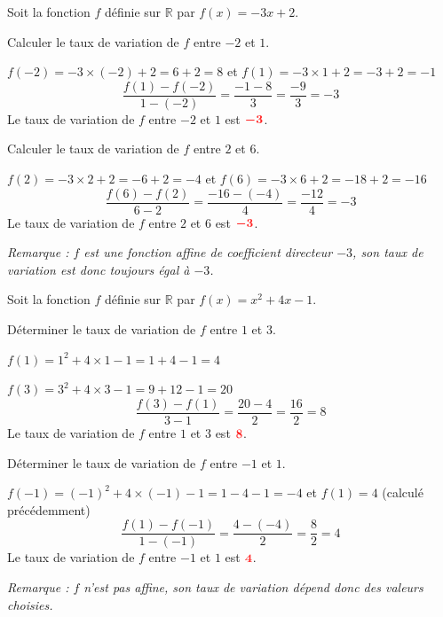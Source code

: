 \documentclass[11pt,a4paper]{article}  %
\begin{document}
\exerciceDS {}
Soit la fonction $f$ définie sur $\mathbb{R}$ par $f(x)=-3x+2$.
\begin{enumMet}
	\item Calculer le taux de variation de $f$ entre $-2$ et $1$.

	\begin{corrBox}
		$f(-2)=-3\times(-2)+2=6+2=8$ \quad et \quad $f(1)=-3\times 1+2=-3+2=-1$
		\[\dfrac{f(1)-f(-2)}{1-(-2)}=\dfrac{-1-8}{3}=\dfrac{-9}{3}=-3\]
		Le taux de variation de $f$ entre $-2$ et $1$ est $\mRouge{-3}$.
	\end{corrBox}

	\item Calculer le taux de variation de $f$ entre $2$ et $6$.

	\begin{corrBox}
		$f(2)=-3\times 2+2=-6+2=-4$ \quad et \quad $f(6)=-3\times 6+2=-18+2=-16$
		\[\dfrac{f(6)-f(2)}{6-2}=\dfrac{-16-(-4)}{4}=\dfrac{-12}{4}=-3\]
		Le taux de variation de $f$ entre $2$ et $6$ est $\mRouge{-3}$.

		\emph{Remarque : $f$ est une fonction affine de coefficient directeur $-3$, son taux de variation est donc toujours égal à $-3$.}
	\end{corrBox}
\end{enumMet}

\exerciceDS {}

Soit la fonction $f$ définie sur $\mathbb{R}$ par $f(x)=x^2+4x-1$.
\begin{enumMet}
	\item Déterminer le taux de variation de $f$ entre $1$ et $3$.

	\begin{corrBox}
		$f(1)=1^2+4\times 1-1=1+4-1=4$

		$f(3)=3^2+4\times 3-1=9+12-1=20$
		\[\dfrac{f(3)-f(1)}{3-1}=\dfrac{20-4}{2}=\dfrac{16}{2}=8\]
		Le taux de variation de $f$ entre $1$ et $3$ est $\mRouge{8}$.
	\end{corrBox}

	\item Déterminer le taux de variation de $f$ entre $-1$ et $1$.

	\begin{corrBox}
		$f(-1)=(-1)^2+4\times(-1)-1=1-4-1=-4$ \quad et \quad $f(1)=4$ (calculé précédemment)
		\[\dfrac{f(1)-f(-1)}{1-(-1)}=\dfrac{4-(-4)}{2}=\dfrac{8}{2}=4\]
		Le taux de variation de $f$ entre $-1$ et $1$ est $\mRouge{4}$.

		\emph{Remarque : $f$ n'est pas affine, son taux de variation dépend donc des valeurs choisies.}
	\end{corrBox}
\end{enumMet}
\end{document}
